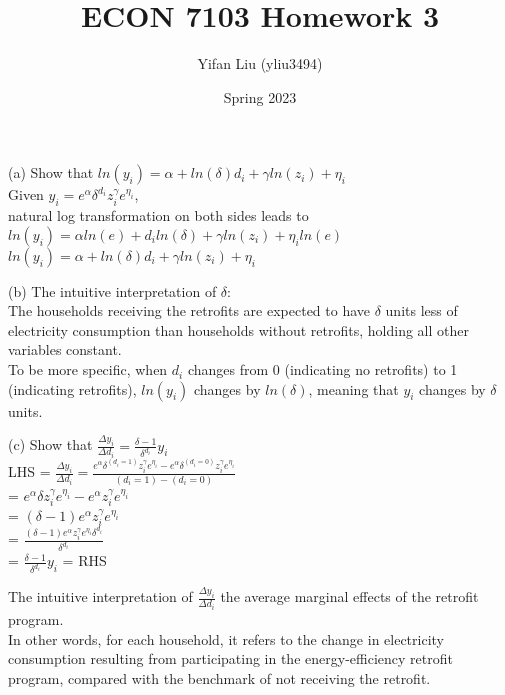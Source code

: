 \documentclass{article}
\title{ECON 7103 Homework 3}
\author{Yifan Liu (yliu3494)}
\date{Spring 2023}
\begin{document}
  
\maketitle


\noindent
(a) Show that $ln(y_i) = \alpha + ln(\delta) d_i + \gamma ln(z_i) + \eta_i$
\bigskip
\\
Given $y_i = e^{\alpha} \delta^{d_i} z_i^{\gamma} e^{\eta_i}$,
\\
natural log transformation on both sides leads to
\\
$ln(y_i) = \alpha ln(e) + d_i ln(\delta)  + \gamma ln(z_i) + \eta_i ln(e)$
\\
$ln(y_i) = \alpha + ln(\delta) d_i + \gamma ln(z_i) + \eta_i$
\bigskip
\bigskip

\noindent
(b) The intuitive interpretation of $\delta$:
\bigskip
\\
The households receiving the retrofits are expected to have $\delta$ units less of electricity consumption than households without retrofits, holding all other variables constant.
\smallskip
\\
To be more specific, when $d_i$ changes from 0 (indicating no retrofits) to 1 (indicating retrofits), $ln(y_i)$ changes by $ln(\delta)$, meaning that $y_i$ changes by $\delta$ units. 
\bigskip
\bigskip

\noindent
(c) Show that $\frac{\Delta y_i}{\Delta d_i} = \frac{\delta - 1}{\delta^{d_i}}  y_i$
\bigskip
\\
LHS = $\frac{\Delta y_i}{\Delta d_i} = \frac{e^{\alpha} \delta^{(d_i = 1)} z_i^{\gamma} e^{\eta_i} - e^{\alpha} \delta^{(d_i = 0)} z_i^{\gamma} e^{\eta_i}}{(d_i = 1) - (d_i = 0)}$
\bigskip
\\
= $e^{\alpha} \delta z_i^{\gamma} e^{\eta_i} - e^{\alpha}  z_i^{\gamma} e^{\eta_i}$
\bigskip
\\
= $(\delta - 1) e^{\alpha} z_i^{\gamma} e^{\eta_i}$
\bigskip
\\
= $\frac{(\delta - 1) e^{\alpha} z_i^{\gamma} e^{\eta_i} \delta^{d_i}}{\delta^{d_i}}$ 
\bigskip
\\
= $\frac{\delta - 1}{\delta^{d_i}}  y_i$
= RHS
\bigskip
\bigskip

\noindent
The intuitive interpretation of $\frac{\Delta y_i}{\Delta d_i}$ the average marginal effects of the retrofit program. 
\bigskip
\\
In other words, for each household, it refers to the change in electricity consumption resulting from participating in the energy-efficiency retrofit program, compared with the benchmark of not receiving the retrofit. 
\bigskip
\bigskip
\end{document}
